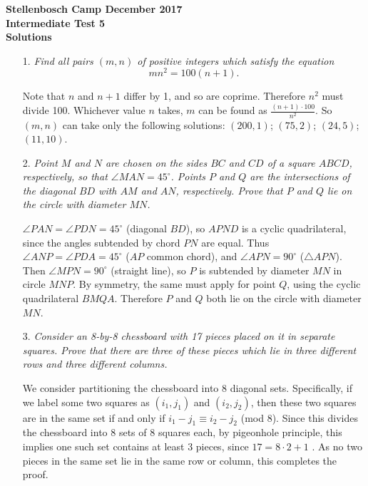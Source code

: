 \documentclass[a4paper,12pt]{article}
\begin{document}
\begin{center}
\textbf{Stellenbosch Camp December 2017 \\ Intermediate Test 5} \\
\textbf{Solutions}
\end{center}


\begin{enumerate}
  
  \item[1.] \emph{Find all pairs $(m,n)$ of positive integers which satisfy the equation
  \[ mn^2 = 100(n+1). \]} 
  
  Note that $n$ and $n+1$ differ by 1, and so are coprime. Therefore $n^2$ must divide 100. Whichever value $n$ takes, $m$ can be found as $\frac{(n+1)\cdot100}{n^2}$. So $(m,n)$ can take only the following solutions: $(200,1)$; $(75,2)$; $(24,5)$; $(11,10)$.
  
  \item[2.] \emph{Point $M$ and $N$ are chosen on the sides $BC$ and $CD$ of a square $ABCD$, respectively, so that $\angle MAN = 45^\circ$. Points $P$ and $Q$ are the intersections of the diagonal $BD$ with $AM$ and $AN$, respectively. Prove that $P$ and $Q$ lie on the circle with diameter $MN$.}
  
  $\angle PAN=\angle PDN = 45^\circ$ (diagonal $BD$), so $APND$ is a cyclic quadrilateral, since the angles subtended by chord $PN$ are equal. Thus $\angle ANP= \angle PDA = 45^\circ$ ($AP$ common chord), and $\angle APN=90^\circ$ ($\triangle APN$). Then $\angle MPN=90^\circ$ (straight line), so $P$ is subtended by diameter $MN$ in circle $MNP$. By symmetry, the same must apply for point $Q$, using the cyclic quadrilateral $BMQA$. Therefore $P$ and $Q$ both lie on the circle with diameter $MN$.
  
  \item[3.] \emph{Consider an 8-by-8 chessboard with 17 pieces placed on it in separate squares. Prove that there are three of these pieces which lie in three different rows and three different columns.}
  
We consider partitioning the chessboard into 8 diagonal sets. Specifically, if we label some two squares as $(i_1, j_1)$ and $(i_2, j_2)$, then these two squares are in the same set if and only if $i_1 - j_1 \equiv i_2 - j_2$ (mod 8). Since this divides the chessboard into 8 sets of 8 squares each, by pigeonhole principle, this implies one such set contains at least 3 pieces, since $17 = 8 \cdot 2 + 1$ . As no two pieces in the same set lie in the same row or column, this completes the proof.



\end{enumerate}
\end{document}
